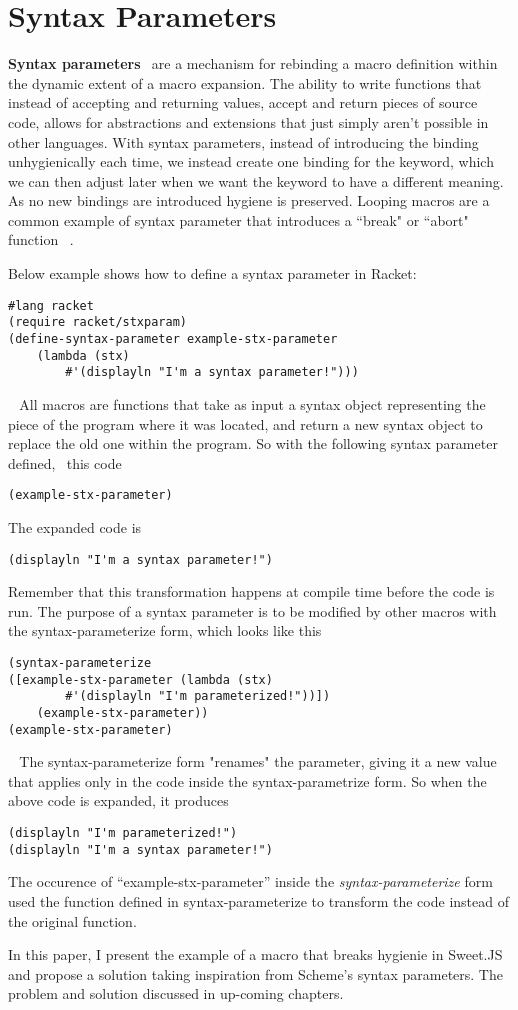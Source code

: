 \section{Syntax Parameters}
\textbf{Syntax parameters} \textcolor{white}{``}are a mechanism for rebinding a macro definition within the dynamic extent of a macro expansion. The ability to write functions that instead of accepting and returning values, accept and return pieces of source code, allows for abstractions and extensions that just simply aren't possible in other languages. With syntax parameters, instead of introducing the binding unhygienically each time, we instead create one binding for the keyword, which we can then adjust later when we want the keyword to have a different meaning. As no new bindings are introduced hygiene is preserved.\textcolor{white}{''}Looping macros are a common example of syntax parameter that introduces a ``break" or ``abort" function ~\cite{bib1}.

Below example shows how to define a syntax parameter in Racket:
\begin{lstlisting}[frame=single]
#lang racket
(require racket/stxparam)
(define-syntax-parameter example-stx-parameter
    (lambda (stx)
        #'(displayln "I'm a syntax parameter!")))
\end{lstlisting}
\textcolor{white}{``}  
All macros are functions that take as input a syntax object representing the piece of the program where it was located, and return a new syntax object to replace the old one within the program. So with the following syntax parameter defined,\textcolor{white}{''} this code
\begin{lstlisting}[frame=single]
(example-stx-parameter)
\end{lstlisting} 
The expanded code is 
\begin{lstlisting}[frame=single]
(displayln "I'm a syntax parameter!")
\end{lstlisting} 
Remember that this transformation happens at compile time before the code is run. The purpose of a syntax parameter is to be modified by other macros with the syntax-parameterize form, which looks like this
\newpage
\begin{lstlisting}[frame=single]
(syntax-parameterize 
([example-stx-parameter (lambda (stx) 
		#'(displayln "I'm parameterized!"))])
    (example-stx-parameter))
(example-stx-parameter)
\end{lstlisting} 
\textcolor{white}{``}
The syntax-parameterize form "renames" the parameter, giving it a new value that applies only in the code inside the syntax-parametrize form. So when the above code is expanded, it produces
\textcolor{white}{''}
\begin{lstlisting}[frame=single]
(displayln "I'm parameterized!")
(displayln "I'm a syntax parameter!")
\end{lstlisting} 
The occurence of ``example-stx-parameter'' inside the \textit{syntax-parameterize} form used the function defined in syntax-parameterize to transform the code instead of the original function.

In this paper, I present the example of a macro that breaks hygienie in Sweet.JS and propose a solution taking inspiration from Scheme's syntax parameters. The problem and solution discussed in up-coming chapters.

